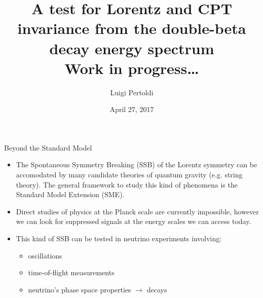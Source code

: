 \documentclass[10pt]{beamer}
\title{A test for Lorentz and CPT invariance from the double-beta decay energy spectrum \\ \small{Work in progress\ldots}}
\date{April 27, 2017}
\author{Luigi Pertoldi}
\institute{Università degli Studi di Padova \\ INFN - Sezione di Padova}
\begin{document}
\maketitle
\begin{frame}{Beyond the Standard Model}
	\begin{itemize}
		\item The Spontaneous Symmetry Breaking (SSB) of the Lorentz symmetry can be accomodated by many candidate theories of quantum gravity (e.g. string theory). The general framework to study this kind of phenomena is the \textcolor{mLightGreen}{Standard Model Extension (SME)}.
		\item Direct studies of physics at the Planck scale are currently impossible, however we can look for suppressed signals at the energy scales we can access today.
		\item This kind of SSB can be tested in neutrino experiments involving:
		\begin{itemize}
			\item oscillations
			\item time-of-flight measurements
			\item \textcolor{mLightBrown}{neutrino's phase space properties $\rightarrow$ decays}
		\end{itemize}
	\end{itemize}
\end{frame}
\end{document}
